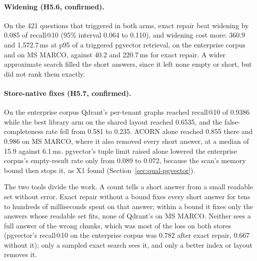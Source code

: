 \paragraph{Widening (H5.6, confirmed).}
On the 421 questions that triggered in both arms, exact repair beat widening by 0.085 of recall@10
(95\% interval 0.064 to 0.110), and widening cost more: 360.9 and
1,572.7\,ms at p95 of a triggered pgvector retrieval, on the enterprise corpus and on MS MARCO, against
40.2 and 220.7\,ms for exact repair. A wider approximate search filled the short answers, since it
left none empty or short, but did not rank them exactly.

\paragraph{Store-native fixes (H5.7, confirmed).}
On the enterprise corpus Qdrant's per-tenant graphs reached recall@10 of 0.9386 while the best library
arm on the shared layout reached 0.6535, and the false-completeness rate fell from 0.581 to 0.235. ACORN
alone reached 0.855 there and 0.986 on MS MARCO, where it also removed every short answer, at a median
of 15.9 against 6.1\,ms. pgvector's tuple limit raised alone lowered the enterprise corpus's
empty-result rate only from 0.089 to 0.072, because the scan's memory bound then stops it, as X1 found
(Section~\ref{sec:qual-pgvector}).

The two tools divide the work. A count tells a short answer from a small readable set without error.
Exact repair without a bound fixes every short answer for tens to hundreds of milliseconds spent on
that answer; within a bound it fixes only the answers whose readable set fits, none of Qdrant's on MS
MARCO. Neither sees a full answer of the wrong chunks, which was most of the loss on both stores
(pgvector's recall@10 on the enterprise corpus was 0.782 after exact repair, 0.667 without it); only
a sampled exact search sees it, and only a better index or layout removes it.

